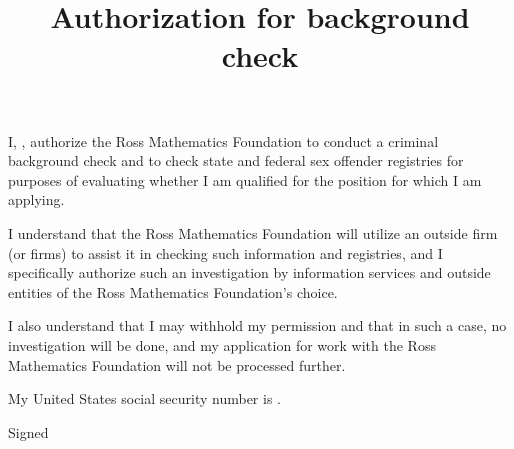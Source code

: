 \documentclass{ross}
\title{Authorization for background check}
\begin{document}
\maketitle

I, , authorize the Ross Mathematics Foundation
to conduct a criminal background check and to check state and federal
sex offender registries for purposes of evaluating whether I am
qualified for the position for which I am applying.

I understand that the Ross Mathematics Foundation will utilize an
outside firm (or firms) to assist it in checking such information and
registries, and I specifically authorize such an investigation by
information services and outside entities of the Ross Mathematics
Foundation's choice.

I also understand that I may withhold my permission and that in such a
case, no investigation will be done, and my application for work with
the Ross Mathematics Foundation will not be processed further.

My United States social security number is .

\vspace{0.75in}
\hfill Signed \underline{\hspace{3in}}
\quad{}
\end{document}
